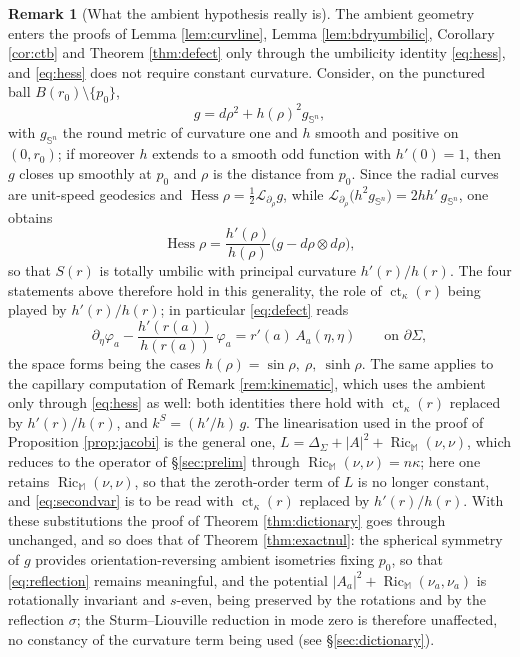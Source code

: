 \documentclass[11pt,a4paper]{amsart}
\theoremstyle{plain}
\theoremstyle{definition}
\newtheorem{remark}[theorem]{Remark}
\newcommand{\M}{\mathbb{M}}
\newcommand{\Sph}{\mathbb{S}}
\newcommand{\ct}{\operatorname{ct}_\kappa}
\newcommand{\Hess}{\operatorname{Hess}}
\newcommand{\Ric}{\operatorname{Ric}}
\begin{document}
\begin{remark}[What the ambient hypothesis really is]\label{rem:warped}
The ambient geometry enters the proofs of Lemma  \ref{lem:curvline}, Lemma  \ref{lem:bdryumbilic}, Corollary  \ref{cor:ctb} and Theorem  \ref{thm:defect} only through the umbilicity identity \eqref{eq:hess}, and \eqref{eq:hess} does not require constant curvature. Consider, on the punctured ball $B(r_0)\setminus\{p_0\}$,
\[
g=d\rho^{2}+h(\rho)^{2}g_{\Sph^{n}} ,
\]
with $g_{\Sph^n}$ the round metric of curvature one and $h$ smooth and positive on $(0,r_0)$; if moreover $h$ extends to a smooth odd function with $h'(0)=1$, then $g$ closes up smoothly at $p_0$ and $\rho$ is the distance from $p_0$.
Since the radial curves are unit-speed geodesics and
$\Hess\rho=\tfrac12\mathcal L_{\partial_\rho}g$, while
$\mathcal L_{\partial_\rho}\bigl(h^{2}g_{\Sph^{n}}\bigr)=2hh'\,g_{\Sph^{n}}$,
one obtains
\[
\Hess\rho=\frac{h'(\rho)}{h(\rho)}\bigl(g-d\rho\otimes d\rho\bigr),
\]
so that $S(r)$ is totally umbilic with principal curvature $h'(r)/h(r)$. The four statements above therefore hold in this generality, the role of $\ct(r)$ being played by $h'(r)/h(r)$; in particular \eqref{eq:defect} reads
\[
\partial_\eta\varphi_a-\frac{h'(r(a))}{h(r(a))}\,\varphi_a
=r'(a)\,A_a(\eta,\eta)\qquad\text{on }\partial\Sigma ,
\]
the space forms being the cases $h(\rho)=\sin\rho,\ \rho,\ \sinh\rho$. The same applies to the capillary computation of Remark \ref{rem:kinematic}, which uses the ambient only through \eqref{eq:hess} as well: both identities there hold with $\ct(r)$ replaced by $h'(r)/h(r)$, and $k^{S}=(h'/h)\,g$. The linearisation used in the proof of Proposition  \ref{prop:jacobi} is the general one, $L=\Delta_\Sigma+|A|^{2}+\Ric_{\M}(\nu,\nu)$, which reduces to the operator of \S\ref{sec:prelim} through $\Ric_{\M}(\nu,\nu)=n\kappa$; here one retains $\Ric_{\M}(\nu,\nu)$, so that the zeroth-order term of $L$ is no longer constant, and \eqref{eq:secondvar} is to be read with $\ct(r)$ replaced by $h'(r)/h(r)$. With these substitutions the proof of Theorem  \ref{thm:dictionary} goes through unchanged, and so does that of Theorem \ref{thm:exactnul}: the spherical symmetry of $g$ provides orientation-reversing ambient isometries fixing $p_0$, so that \eqref{eq:reflection} remains meaningful, and the potential $|A_a|^{2}+\Ric_{\M}(\nu_a,\nu_a)$ is rotationally invariant and $s$-even, being
preserved by the rotations and by the reflection $\sigma$; the Sturm--Liouville reduction in mode zero is therefore unaffected, no constancy of the curvature term being used (see \S\ref{sec:dictionary}).


\end{remark}
\end{document}
